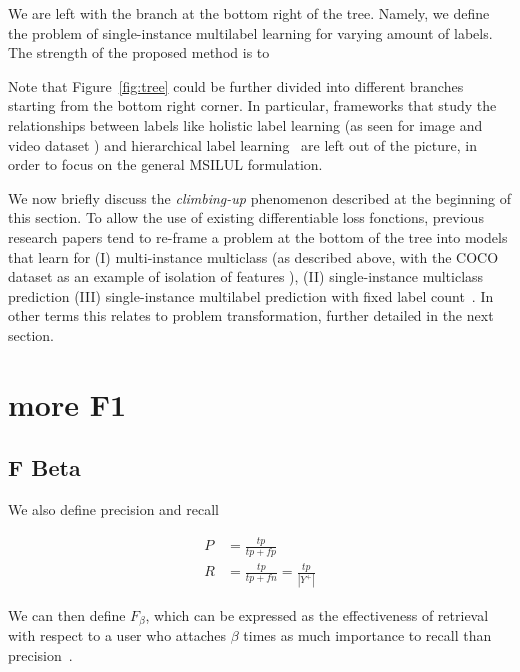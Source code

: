We are left with the branch at the bottom right of the tree. Namely, we define the problem of single-instance multilabel learning for varying amount of labels. The strength of the proposed method is to 

Note that Figure~\ref{fig:tree} could be further divided into different branches starting from the bottom right corner. In particular, frameworks that study the relationships between labels like holistic label learning (as seen for image \cite{holisticImageDescriptors,holisticLungs} and video dataset \cite{holisticVideoData} ) and hierarchical label learning~\cite{activeLearningMultiLabel, HARAM} are left out of the picture, in order to focus on the general MSILUL formulation. 

We now briefly discuss the \emph{climbing-up} phenomenon described at the beginning of this section. To allow the use of existing differentiable loss fonctions, previous research papers tend to re-frame a problem at the bottom of the tree into models that learn for (I) multi-instance multiclass (as described above, with the COCO dataset as an example of isolation of features \cite{COCO}), (II) single-instance multiclass prediction \cite{multiclass} (III) single-instance multilabel prediction with fixed label count~\cite{threshForF1}. In other terms this relates to problem transformation, further detailed in the next section.


\section{more F1}

\subsection{F Beta}

We also define precision and recall

\begin{equation}
\begin{aligned} P &=\frac{t p}{t p+f p} \\ R &=\frac{t p}{t p+f n}=\frac{t p}{\left|Y^{+}\right|} \end{aligned}
\end{equation}

We can then define \(F_\beta\), which can be expressed as the effectiveness of retrieval with respect to a user who attaches \(\beta\) times as much importance to recall than precision~\cite{informationRetrieval}.

